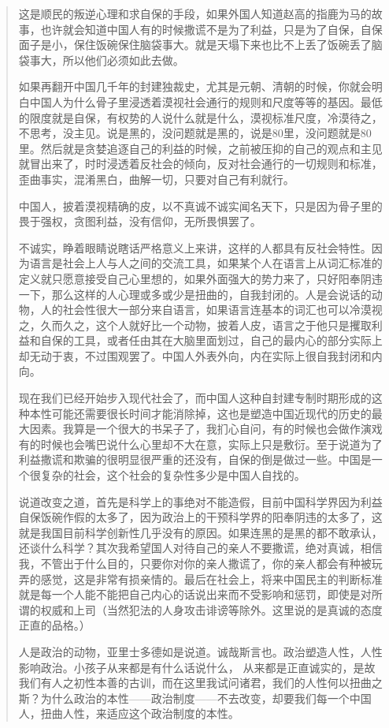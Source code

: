 \documentclass[12pt,oneside]{book}
\begin{document}
\begin{common-format}
\begin{quotation}
这是顺民的叛逆心理和求自保的手段，如果外国人知道赵高的指鹿为马的故事，也许就会知道中国人有的时候撒谎不是为了利益，只是为了自保，自保面子是小，保住饭碗保住脑袋事大。就是天塌下来也比不上丢了饭碗丢了脑袋事大，所以他们必须如此去做。

如果再翻开中国几千年的封建独裁史，尤其是元朝、清朝的时候，你就会明白中国人为什么骨子里浸透着漠视社会通行的规则和尺度等等的基因。最低的限度就是自保，有权势的人说什么就是什么，漠视标准尺度，冷漠待之，不思考，没主见。说是黑的，没问题就是黑的，说是80里，没问题就是80里。然后就是贪婪追逐自己的利益的时候，之前被压抑的自己的观点和主见就冒出来了，时时浸透着反社会的倾向，反对社会通行的一切规则和标准，歪曲事实，混淆黑白，曲解一切，只要对自己有利就行。

中国人，披着漠视精确的皮，以不真诚不诚实闻名天下，只是因为骨子里的畏于强权，贪图利益，没有信仰，无所畏惧罢了。﻿

不诚实，睁着眼睛说瞎话严格意义上来讲，这样的人都具有反社会特性。因为语言是社会上人与人之间的交流工具，如果某个人在语言上从词汇标准的定义就只愿意接受自己心里想的，如果外面强大的势力来了，只好阳奉阴违一下，那么这样的人心理或多或少是扭曲的，自我封闭的。人是会说话的动物，人的社会性很大一部分来自语言，如果语言连基本的词汇也可以冷漠视之，久而久之，这个人就好比一个动物，披着人皮，语言之于他只是攫取利益和自保的工具，或者任由其在大脑里面划过，自己的最内心的部分实际上却无动于衷，不过围观罢了。中国人外表外向，内在实际上很自我封闭和内向。

现在我们已经开始步入现代社会了，而中国人这种自封建专制时期形成的这种本性可能还需要很长时间才能消除掉，这也是塑造中国近现代的历史的最大因素。我算是一个很大的书呆子了，我扪心自问，有的时候也会做作演戏有的时候也会嘴巴说什么心里却不大在意，实际上只是敷衍。至于说道为了利益撒谎和欺骗的很明显很严重的还没有，自保的倒是做过一些。中国是一个很复杂的社会，这个社会的复杂性多少是中国人自找的。

说道改变之道，首先是科学上的事绝对不能造假，目前中国科学界因为利益自保饭碗作假的太多了，因为政治上的干预科学界的阳奉阴违的太多了，这就是我国目前科学创新性几乎没有的原因。如果连黑的是黑的都不敢承认，还谈什么科学？其次我希望国人对待自己的亲人不要撒谎，绝对真诚，相信我，不管出于什么目的，只要你对你的亲人撒谎了，你的亲人都会有种被玩弄的感觉，这是非常有损亲情的。最后在社会上，将来中国民主的判断标准就是每一个人能不能把自己内心的话说出来而不受影响和惩罚，即使是对所谓的权威和上司（当然犯法的人身攻击诽谤等除外。这里说的是真诚的态度正直的品格。）

人是政治的动物，亚里士多德如是说道。诚哉斯言也。政治塑造人性，人性影响政治。小孩子从来都是有什么话说什么， 从来都是正直诚实的，是故我们有人之初性本善的古训，而在这里我试问诸君，我们的人性何以扭曲之斯？为什么政治的本性——政治制度——不去改变，却要我们每一个中国人，扭曲人性，来适应这个政治制度的本性。


\end{quotation}
\end{common-format}
\end{document}
